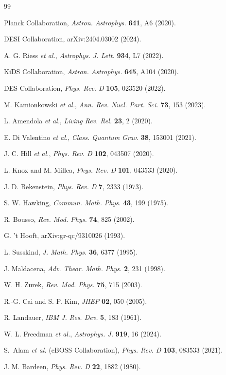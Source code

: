 \documentclass[twocolumn,superscriptaddress,prl,amsmath,amssymb]{revtex4-2}
\begin{document}
\begin{thebibliography}{99}

Planck Collaboration,
\textit{Astron. Astrophys.} \textbf{641}, A6 (2020).

DESI Collaboration,
arXiv:2404.03002 (2024).

A. G. Riess \textit{et al.},
\textit{Astrophys. J. Lett.} \textbf{934}, L7 (2022).

KiDS Collaboration,
\textit{Astron. Astrophys.} \textbf{645}, A104 (2020).

DES Collaboration,
\textit{Phys. Rev. D} \textbf{105}, 023520 (2022).

M. Kamionkowski \textit{et al.},
\textit{Ann. Rev. Nucl. Part. Sci.} \textbf{73}, 153 (2023).

L. Amendola \textit{et al.},
\textit{Living Rev. Rel.} \textbf{23}, 2 (2020).

E. Di Valentino \textit{et al.},
\textit{Class. Quantum Grav.} \textbf{38}, 153001 (2021).

J. C. Hill \textit{et al.},
\textit{Phys. Rev. D} \textbf{102}, 043507 (2020).

L. Knox and M. Millea,
\textit{Phys. Rev. D} \textbf{101}, 043533 (2020).

J. D. Bekenstein,
\textit{Phys. Rev. D} \textbf{7}, 2333 (1973).

S. W. Hawking,
\textit{Commun. Math. Phys.} \textbf{43}, 199 (1975).

R. Bousso,
\textit{Rev. Mod. Phys.} \textbf{74}, 825 (2002).

G. 't Hooft,
arXiv:gr-qc/9310026 (1993).

L. Susskind,
\textit{J. Math. Phys.} \textbf{36}, 6377 (1995).

J. Maldacena,
\textit{Adv. Theor. Math. Phys.} \textbf{2}, 231 (1998).

W. H. Zurek,
\textit{Rev. Mod. Phys.} \textbf{75}, 715 (2003).

R.-G. Cai and S. P. Kim,
\textit{JHEP} \textbf{02}, 050 (2005).

R. Landauer,
\textit{IBM J. Res. Dev.} \textbf{5}, 183 (1961).

W. L. Freedman \textit{et al.},
\textit{Astrophys. J.} \textbf{919}, 16 (2024).

S.~Alam \textit{et al.} (eBOSS Collaboration),
\textit{Phys. Rev. D} \textbf{103}, 083533 (2021).

J. M. Bardeen,
\textit{Phys. Rev. D} \textbf{22}, 1882 (1980).

\end{thebibliography}
\end{document}
